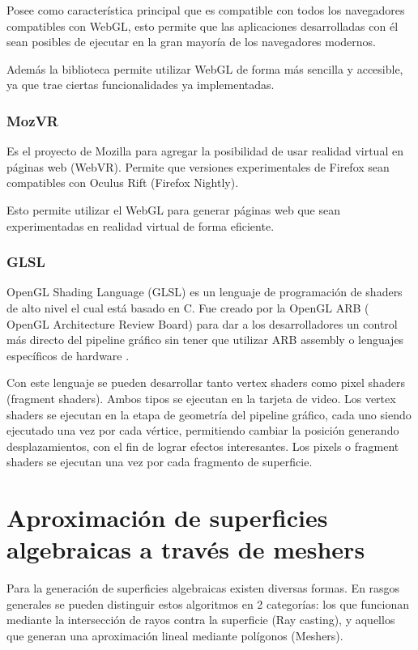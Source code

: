 \documentclass[12pt]{article}
\begin{document}
Posee como característica principal que es compatible con todos los navegadores compatibles con WebGL, esto permite que las aplicaciones desarrolladas con él sean posibles de ejecutar en la gran mayoría de los navegadores modernos.

Además la biblioteca permite utilizar WebGL de forma más sencilla y accesible, ya que trae ciertas funcionalidades ya implementadas.
\subsubsection{MozVR}
\noindent Es el proyecto de Mozilla para agregar la posibilidad de usar realidad virtual en páginas web (WebVR)\cite{mozvr}. Permite que versiones experimentales de Firefox sean compatibles con Oculus Rift (Firefox Nightly\cite{nightly}).

Esto permite utilizar el WebGL para generar páginas web que sean experimentadas en realidad virtual de forma eficiente.
\subsubsection{GLSL}
\noindent OpenGL Shading Language (GLSL) es un lenguaje de programación de shaders de alto nivel el cual está basado en C. Fue creado por la OpenGL ARB ( OpenGL Architecture Review Board) para dar a los desarrolladores un control más directo del pipeline gráfico sin tener que utilizar ARB assembly o lenguajes específicos de hardware .

Con este lenguaje se pueden desarrollar tanto vertex shaders como pixel shaders (fragment shaders). Ambos tipos se ejecutan en la tarjeta de video. Los vertex shaders se ejecutan en la etapa de geometría del pipeline gráfico, cada uno siendo ejecutado una vez por cada vértice, permitiendo cambiar la posición generando desplazamientos, con el fin de lograr efectos interesantes. Los pixels o fragment shaders se ejecutan una vez por cada fragmento de superficie.

\clearpage
\section{Aproximación de superficies algebraicas a través de meshers}
\noindent Para la generación de superficies algebraicas existen diversas formas. En rasgos generales se pueden distinguir estos algoritmos en 2 categorías: los que funcionan mediante la intersección de rayos contra la superficie (Ray casting), y aquellos que generan una aproximación lineal mediante polígonos (Meshers).
\end{document}
